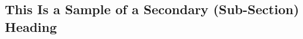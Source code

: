 \documentclass[letterpaper, preprint, paper,11pt]{AAS}	%
\begin{document}
%




\subsection{This Is a Sample of a Secondary (Sub-Section) Heading}

\end{document}
